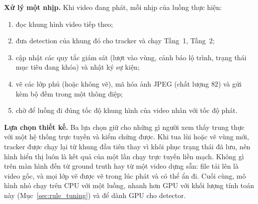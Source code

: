 \textbf{Xử lý một nhịp.} Khi video đang phát, mỗi nhịp của luồng thực hiện:
\begin{enumerate}
    \item đọc khung hình video tiếp theo;
    \item đưa detection của khung đó cho tracker và chạy Tầng~1, Tầng~2;
    \item cập nhật các quy tắc giám sát (lượt vào vùng, cảnh báo lộ trình, trạng thái mục tiêu đang khóa) và nhật ký sự kiện;
    \item vẽ các lớp phủ (hoặc không vẽ), mã hóa ảnh JPEG (chất lượng $82$) và gửi kèm bộ đếm trong một thông điệp;
    \item chờ để luồng đi đúng tốc độ khung hình của video nhân với tốc độ phát.
\end{enumerate}

\textbf{Lựa chọn thiết kế.} Ba lựa chọn giữ cho những gì người xem thấy trung thực với một hệ thống trực tuyến và kiểm chứng được. Khi tua lùi hoặc vẽ vùng mới, tracker được chạy lại từ khung đầu tiên thay vì khôi phục trạng thái đã lưu, nên hình hiển thị luôn là kết quả của một lần chạy trực tuyến liền mạch. Không gì trên màn hình đến từ ground truth hay từ một video dựng sẵn: file tải lên là video gốc, và mọi lớp vẽ được vẽ trong lúc phát và có thể ẩn đi. Cuối cùng, mô hình nhỏ chạy trên CPU với một luồng, nhanh hơn GPU với khối lượng tính toán này (Mục~\ref{sec:rule_tuning}) và để dành GPU cho detector.


